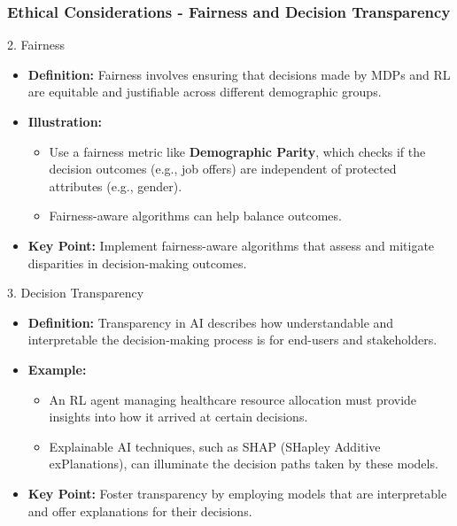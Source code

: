 \documentclass[aspectratio=169]{beamer}
\begin{document}
\begin{frame}[fragile]
    \frametitle{Ethical Considerations - Fairness and Decision Transparency}
    \begin{block}{2. Fairness}
        \begin{itemize}
            \item \textbf{Definition:} Fairness involves ensuring that decisions made by MDPs and RL are equitable and justifiable across different demographic groups.
            \item \textbf{Illustration:} 
                \begin{itemize}
                    \item Use a fairness metric like \textbf{Demographic Parity}, which checks if the decision outcomes (e.g., job offers) are independent of protected attributes (e.g., gender). 
                    \item Fairness-aware algorithms can help balance outcomes.
                \end{itemize}
            \item \textbf{Key Point:} Implement fairness-aware algorithms that assess and mitigate disparities in decision-making outcomes.
        \end{itemize}
    \end{block}

    \begin{block}{3. Decision Transparency}
        \begin{itemize}
            \item \textbf{Definition:} Transparency in AI describes how understandable and interpretable the decision-making process is for end-users and stakeholders.
            \item \textbf{Example:}
                \begin{itemize}
                    \item An RL agent managing healthcare resource allocation must provide insights into how it arrived at certain decisions.
                    \item Explainable AI techniques, such as SHAP (SHapley Additive exPlanations), can illuminate the decision paths taken by these models.
                \end{itemize}
            \item \textbf{Key Point:} Foster transparency by employing models that are interpretable and offer explanations for their decisions.
        \end{itemize}
    \end{block}
\end{frame}
\end{document}
